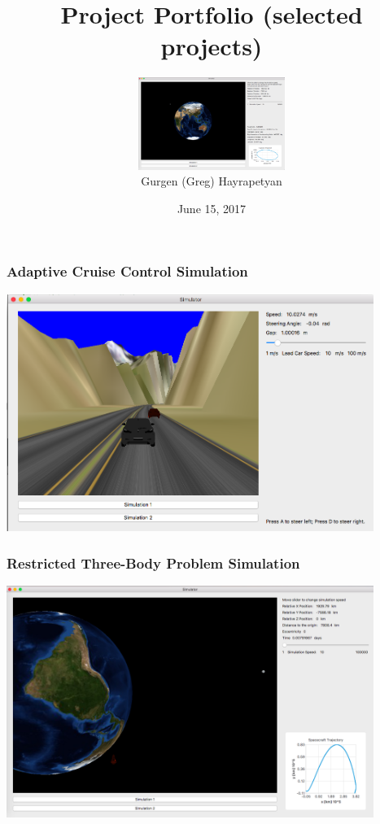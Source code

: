 \documentclass[mathserif]{beamer}
\title{Project Portfolio (selected projects)}
\author{}
\institute{
}
\date{June 15, 2017}
\author[Gurgen Hayrapetyan]{
\includegraphics[height=3cm]{sat3.png}\\
Gurgen (Greg) Hayrapetyan}
\begin{document}
\begin{frame}
\titlepage
\end{frame}


%
%
%
%
%
%
%
%
%
%
%
%

\begin{frame}
\frametitle{Adaptive Cruise Control Simulation}

\includegraphics[width=4.7in]{SimulatorScreenShot.png}

\end{frame}

\begin{frame}
\frametitle{Restricted Three-Body Problem Simulation}

\includegraphics[width=4.7in]{Restricted3Body.png}


\end{frame}
\end{document}
